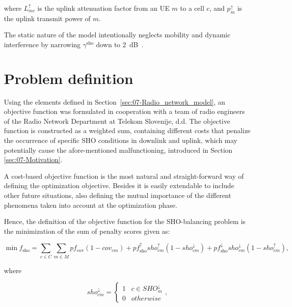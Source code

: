 \noindent where $L_{mc}^{\uparrow}$ is the uplink attenuation factor
from an UE $m$ to a cell $c$, and $p_{m}^{\uparrow}$
is the uplink transmit power of $m$.

The static nature of the model intentionally neglects mobility and
dynamic interference by narrowing $\gamma^{\mathrm{sho}}$ down to
2~dB~\cite{nawrocki2006understanding}.


\section{Problem definition \label{sec:07-Problem_definition}}

Using the elements defined in Section~\ref{sec:07-Radio_network_model},
an objective function was formulated in cooperation with a team of
radio engineers of the Radio Network Department at Telekom Slovenije,
d.d. The objective function is constructed as a weighted sum, containing
different costs that penalize the occurrence of specific SHO conditions
in downlink and uplink, which may potentially cause the afore-mentioned
malfunctioning, introduced in Section \ref{sec:07-Motivation}.

A cost-based objective function is the most natural and straight-forward
way of defining the optimization objective. Besides it is easily extendable
to include other future situations, also defining the mutual importance
of the different phenomena taken into account at the optimization
phase.

Hence, the definition of the objective function for the SHO-balancing
problem is the minimization of the sum of penalty scores given as:

\begin{equation}
\min f_{\mathrm{sho}}=\sum_{c\in C}\sum_{m\in M}pf_{\mathrm{cov}}(1-cov_{cm})+pf_{\mathrm{sho}}^{\uparrow}sho_{cm}^{\uparrow}(1-sho_{cm}^{\downarrow})+pf_{\mathrm{sho}}^{\downarrow}sho_{cm}^{\downarrow}(1-sho_{cm}^{\uparrow}),\label{eq:07-objective_function}
\end{equation}



\noindent where 

\begin{equation}
sho_{cm}^{\downarrow}=\begin{cases}
1 & c\in SHO_{m}^{\downarrow}\\
0 & otherwise
\end{cases},
\end{equation}


